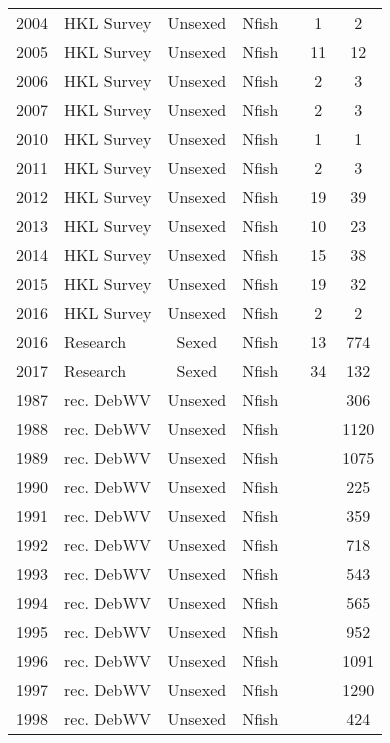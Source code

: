 \begin{longtable}[t]{c>{\centering\arraybackslash}p{3cm}ccccc}
2004 & HKL Survey & Unsexed & Nfish &  & 1 & 2\\
2005 & HKL Survey & Unsexed & Nfish &  & 11 & 12\\
2006 & HKL Survey & Unsexed & Nfish &  & 2 & 3\\
2007 & HKL Survey & Unsexed & Nfish &  & 2 & 3\\
2010 & HKL Survey & Unsexed & Nfish &  & 1 & 1\\
2011 & HKL Survey & Unsexed & Nfish &  & 2 & 3\\
2012 & HKL Survey & Unsexed & Nfish &  & 19 & 39\\
2013 & HKL Survey & Unsexed & Nfish &  & 10 & 23\\
2014 & HKL Survey & Unsexed & Nfish &  & 15 & 38\\
2015 & HKL Survey & Unsexed & Nfish &  & 19 & 32\\
2016 & HKL Survey & Unsexed & Nfish &  & 2 & 2\\
2016 & Research & Sexed & Nfish &  & 13 & 774\\
2017 & Research & Sexed & Nfish &  & 34 & 132\\
1987 & rec. DebWV & Unsexed & Nfish &  &  & 306\\
1988 & rec. DebWV & Unsexed & Nfish &  &  & 1120\\
1989 & rec. DebWV & Unsexed & Nfish &  &  & 1075\\
1990 & rec. DebWV & Unsexed & Nfish &  &  & 225\\
1991 & rec. DebWV & Unsexed & Nfish &  &  & 359\\
1992 & rec. DebWV & Unsexed & Nfish &  &  & 718\\
1993 & rec. DebWV & Unsexed & Nfish &  &  & 543\\
1994 & rec. DebWV & Unsexed & Nfish &  &  & 565\\
1995 & rec. DebWV & Unsexed & Nfish &  &  & 952\\
1996 & rec. DebWV & Unsexed & Nfish &  &  & 1091\\
1997 & rec. DebWV & Unsexed & Nfish &  &  & 1290\\
1998 & rec. DebWV & Unsexed & Nfish &  &  & 424\\*
\end{longtable}
\endgroup{}
\endgroup{}
